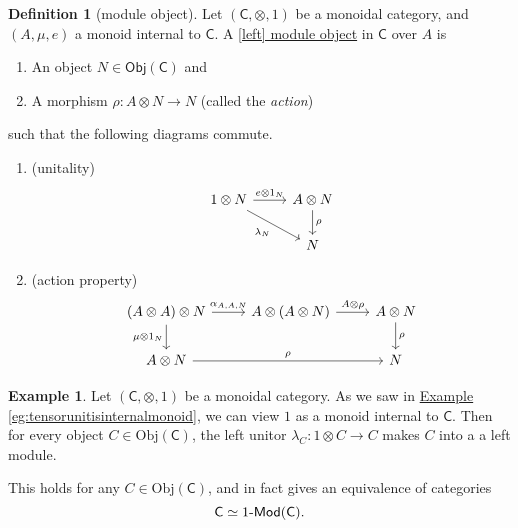 \documentclass[a4paper]{report}
\newcommand{\defn}[1]{\ul{#1}}
\newcommand{\Obj}{\mathrm{Obj}}
\def\mhyp{{\hbox{-}}}
\theoremstyle{definition}
\newtheorem{definition}{Definition}[section]
\newtheorem{example}{Example}[section]
\theoremstyle{plain}
\theoremstyle{remark}
\begin{document}
\begin{definition}[module object]
  \label{def:moduleobject}
  Let $(\mathsf{C}, \otimes, 1)$ be a monoidal category, and $(A, \mu, e)$ a monoid internal to $\mathsf{C}$. A \defn{[left] module object} in $\mathsf{C}$ over $A$ is
  \begin{enumerate}
    \item An object $N \in \mathsf{Obj}(\mathsf{C})$ and

    \item A morphism $\rho\colon A \otimes N \to N$ (called the \emph{action})
  \end{enumerate}
  such that the following diagrams commute.
  \begin{enumerate}
    \item (unitality)
      \begin{equation*}
        \begin{tikzcd}
          1 \otimes N
          \arrow[r, "e \otimes 1_{N}"]
          \arrow[dr, swap, "\lambda_{N}"]
          & A \otimes N
          \arrow[d, "\rho"]
          \\
          & N
        \end{tikzcd}
      \end{equation*}

    \item (action property)
      \begin{equation*}
        \begin{tikzcd}
          (A \otimes A) \otimes N
          \arrow[r, "{\alpha_{A, A, N}}"]
          \arrow[d, swap, "\mu \otimes 1_{N}"]
          & A \otimes (A \otimes N)
          \arrow[r, "A \otimes \rho"]
          & A \otimes N
          \arrow[d, "\rho"]
          \\
          A \otimes N
          \arrow[rr, "\rho"]
          & & N
        \end{tikzcd}
      \end{equation*}
  \end{enumerate}
\end{definition}

\begin{example}
  \label{eg:categoryof1modulesisequivalenttocategoryitself}
  Let $(\mathsf{C}, \otimes, 1)$ be a monoidal category. As we saw in \hyperref[eg:tensorunitisinternalmonoid]{Example \ref*{eg:tensorunitisinternalmonoid}}, we can view $1$ as a monoid internal to $\mathsf{C}$. Then for every object $C \in \Obj(\mathsf{C})$, the left unitor $\lambda_{C}\colon 1 \otimes C \to C$ makes $C$ into a a left module.

  This holds for any $C \in \Obj(\mathsf{C})$, and in fact gives an equivalence of categories
  \begin{equation*}
    \mathsf{C} \simeq 1\mhyp\mathsf{Mod}(\mathsf{C}).
  \end{equation*}
\end{example}
\end{document}
